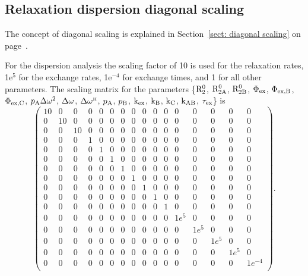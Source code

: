
\subsection{Relaxation dispersion diagonal scaling}

The concept of diagonal scaling is explained in Section~\ref{sect: diagonal scaling} on page~\pageref{sect: diagonal scaling}.

For the dispersion analysis the scaling factor of 10 is used for the relaxation rates, 1e$^5$ for the exchange rates, 1e$^{-4}$ for exchange times, and 1 for all other parameters.
The scaling matrix for the parameters \{$\mathrm{R}_2^0$, $\mathrm{R}_{\mathrm{2A}}^0$, $\mathrm{R}_{\mathrm{2B}}^0$, $\Phi_{\textrm{ex}}$, $\Phi_{\textrm{ex,B}}$, $\Phi_{\textrm{ex,C}}$, $p_{\textrm{A}}\Delta\omega^2$, $\Delta\omega$, $\Delta\omega^{\scriptscriptstyle\mathrm{H}}$, $p_{\textrm{A}}$, $p_{\textrm{B}}$, $\textrm{k}_{\textrm{ex}}$, $\textrm{k}_{\textrm{B}}$, $\textrm{k}_{\textrm{C}}$, $\textrm{k}_{\textrm{AB}}$, $\tau_{\textrm{ex}}$\} is
\begin{equation}
    \begin{pmatrix}
        10 & 0  & 0  & 0 & 0 & 0 & 0 & 0 & 0 & 0 & 0 & 0    & 0    & 0    & 0    & 0       \\
        0  & 10 & 0  & 0 & 0 & 0 & 0 & 0 & 0 & 0 & 0 & 0    & 0    & 0    & 0    & 0       \\
        0  & 0  & 10 & 0 & 0 & 0 & 0 & 0 & 0 & 0 & 0 & 0    & 0    & 0    & 0    & 0       \\
        0  & 0  & 0  & 1 & 0 & 0 & 0 & 0 & 0 & 0 & 0 & 0    & 0    & 0    & 0    & 0       \\
        0  & 0  & 0  & 0 & 1 & 0 & 0 & 0 & 0 & 0 & 0 & 0    & 0    & 0    & 0    & 0       \\
        0  & 0  & 0  & 0 & 0 & 1 & 0 & 0 & 0 & 0 & 0 & 0    & 0    & 0    & 0    & 0       \\
        0  & 0  & 0  & 0 & 0 & 0 & 1 & 0 & 0 & 0 & 0 & 0    & 0    & 0    & 0    & 0       \\
        0  & 0  & 0  & 0 & 0 & 0 & 0 & 1 & 0 & 0 & 0 & 0    & 0    & 0    & 0    & 0       \\
        0  & 0  & 0  & 0 & 0 & 0 & 0 & 0 & 1 & 0 & 0 & 0    & 0    & 0    & 0    & 0       \\
        0  & 0  & 0  & 0 & 0 & 0 & 0 & 0 & 0 & 1 & 0 & 0    & 0    & 0    & 0    & 0       \\
        0  & 0  & 0  & 0 & 0 & 0 & 0 & 0 & 0 & 0 & 1 & 0    & 0    & 0    & 0    & 0       \\
        0  & 0  & 0  & 0 & 0 & 0 & 0 & 0 & 0 & 0 & 0 & 1e^5 & 0    & 0    & 0    & 0       \\
        0  & 0  & 0  & 0 & 0 & 0 & 0 & 0 & 0 & 0 & 0 & 0    & 1e^5 & 0    & 0    & 0       \\
        0  & 0  & 0  & 0 & 0 & 0 & 0 & 0 & 0 & 0 & 0 & 0    & 0    & 1e^5 & 0    & 0       \\
        0  & 0  & 0  & 0 & 0 & 0 & 0 & 0 & 0 & 0 & 0 & 0    & 0    & 0    & 1e^5 & 0       \\
        0  & 0  & 0  & 0 & 0 & 0 & 0 & 0 & 0 & 0 & 0 & 0    & 0    & 0    & 0    & 1e^{-4} \\
    \end{pmatrix}.
\end{equation}


